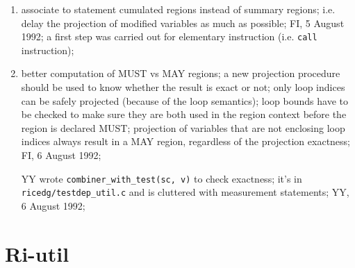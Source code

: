 \begin{enumerate}

  \item associate to statement cumulated regions instead of summary regions;
	i.e. delay the projection of modified variables as much as
	possible; FI, 5 August 1992; a first step was carried out for
	elementary instruction (i.e. \verb+call+ instruction);

  \item better computation of MUST vs MAY regions; a new projection procedure
	should be used to know whether the result is exact or not; only
	loop indices can be safely projected (because of the loop semantics);
	loop bounds have to be checked to make sure they are both used
	in the region context before the region is declared MUST; projection
	of variables that are not enclosing loop indices always result
	in a MAY region, regardless of the projection exactness;
	FI, 6 August 1992;

	YY wrote \verb+combiner_with_test(sc, v)+ to check exactness;
	it's in \verb+ricedg/testdep_util.c+ and is cluttered with
	measurement statements; YY, 6 August 1992;

\end{enumerate}

\section{Ri-util}

